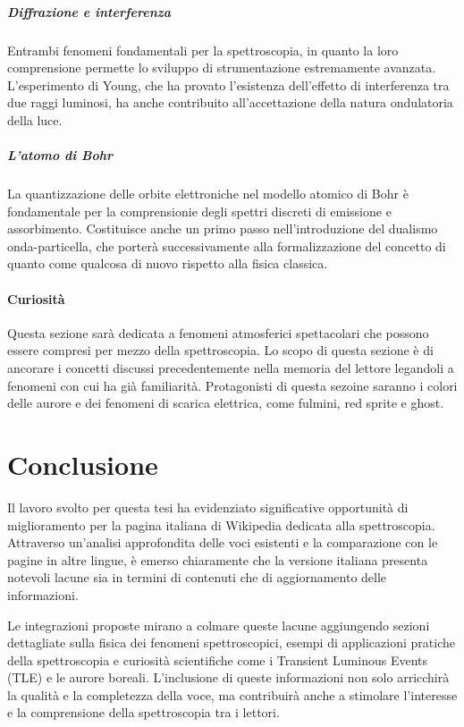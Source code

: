 \documentclass[12pt,a4paper]{report}
\begin{document}
\paragraph{Diffrazione e interferenza} Entrambi fenomeni fondamentali per la spettroscopia, in quanto la loro comprensione permette lo sviluppo di strumentazione estremamente avanzata. L'esperimento di Young, che ha provato l'esistenza dell'effetto di interferenza tra due raggi luminosi, ha anche contribuito all'accettazione della natura ondulatoria della luce.
\paragraph{L'atomo di Bohr} La quantizzazione delle orbite elettroniche nel modello atomico di Bohr è fondamentale per la comprensionie degli spettri discreti di emissione e assorbimento. Costituisce anche un primo passo nell'introduzione del dualismo onda-particella, che porterà successivamente alla formalizzazione del concetto di quanto come qualcosa di nuovo rispetto alla fisica classica.

\subsubsection{Curiosità}

Questa sezione sarà dedicata a fenomeni atmosferici spettacolari che possono essere compresi per mezzo della spettroscopia. Lo scopo di questa sezione è di ancorare i concetti discussi precedentemente nella memoria del lettore legandoli a fenomeni con cui ha già familiarità. Protagonisti di questa sezoine saranno i colori delle aurore e dei fenomeni di scarica elettrica, come fulmini, red sprite e ghost.

\chapter{Conclusione}

Il lavoro svolto per questa tesi ha evidenziato significative opportunità di miglioramento per la pagina italiana di Wikipedia dedicata alla spettroscopia. Attraverso un'analisi approfondita delle voci esistenti e la comparazione con le pagine in altre lingue, è emerso chiaramente che la versione italiana presenta notevoli lacune sia in termini di contenuti che di aggiornamento delle informazioni.

Le integrazioni proposte mirano a colmare queste lacune aggiungendo sezioni dettagliate sulla fisica dei fenomeni spettroscopici, esempi di applicazioni pratiche della spettroscopia e curiosità scientifiche come i Transient Luminous Events (TLE) e le aurore boreali. L'inclusione di queste informazioni non solo arricchirà la qualità e la completezza della voce, ma contribuirà anche a stimolare l'interesse e la comprensione della spettroscopia tra i lettori.
\end{document}
